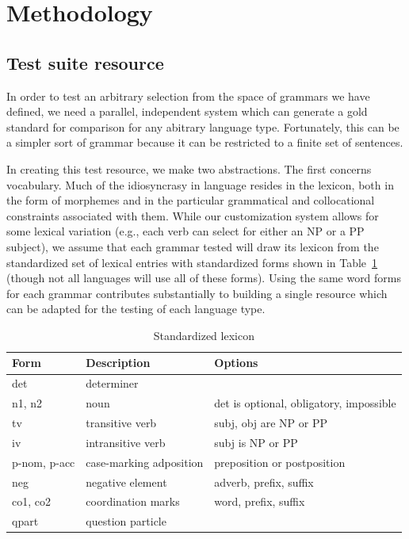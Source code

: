 \documentclass[11pt]{article}
\begin{document}
\section{Methodology}

\subsection{Test suite resource}

In order to test an arbitrary selection from the space of grammars we have
defined, we need a parallel, independent system which can generate a gold
standard for comparison for any abitrary language type.  Fortunately,
this can be a simpler sort of grammar because it can be restricted to a
finite set of sentences.

In creating this test resource, we make two abstractions. The first
concerns vocabulary.  Much of the idiosyncrasy in language resides in
the lexicon, both in the form of morphemes and in the particular
grammatical and collocational constraints associated with them.  While
our customization system allows for some lexical variation (e.g., each
verb can select for either an NP or a PP subject), we assume that
each grammar tested will draw its lexicon from the 
standardized set of lexical entries with standardized forms shown in
Table~\ref{tab1} (though
not all languages will use all of these forms).
Using the same word forms for each grammar contributes substantially
to building a single resource which can be adapted for the testing
of each language type.


\begin{table}[ht]
\begin{center}
\begin{tabular}{|l|l|l|}
\hline
Form & Description & Options \\ \hline \hline
det & determiner & \\ \hline
n1, n2 & noun & det is optional, obligatory, impossible\\
tv & transitive verb & subj, obj are NP or PP\\
iv & intransitive verb & subj is NP or PP\\
p-nom, p-acc & case-marking adposition & preposition or postposition\\
neg & negative element & adverb, prefix, suffix\\
co1, co2 & coordination marks & word, prefix, suffix\\
qpart & question particle & \\
\hline
\end{tabular}
\end{center}
\caption{Standardized lexicon}
\label{tab1}
\end{table}
\end{document}
